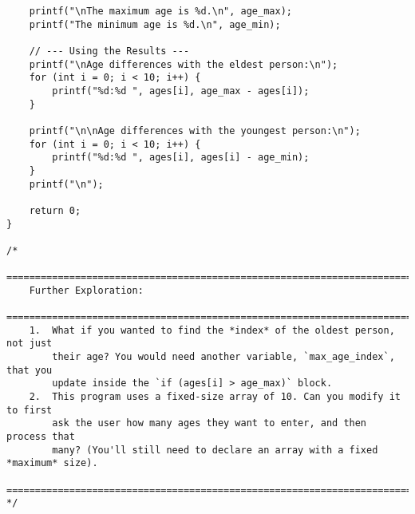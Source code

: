 \documentclass[11pt]{book}
\begin{document}
\begin{verbatim}
    printf("\nThe maximum age is %d.\n", age_max);
    printf("The minimum age is %d.\n", age_min);

    // --- Using the Results ---
    printf("\nAge differences with the eldest person:\n");
    for (int i = 0; i < 10; i++) {
        printf("%d:%d ", ages[i], age_max - ages[i]);
    }

    printf("\n\nAge differences with the youngest person:\n");
    for (int i = 0; i < 10; i++) {
        printf("%d:%d ", ages[i], ages[i] - age_min);
    }
    printf("\n");

    return 0;
}

/*
    ================================================================================
    Further Exploration:
    ================================================================================
    1.  What if you wanted to find the *index* of the oldest person, not just
        their age? You would need another variable, `max_age_index`, that you
        update inside the `if (ages[i] > age_max)` block.
    2.  This program uses a fixed-size array of 10. Can you modify it to first
        ask the user how many ages they want to enter, and then process that
        many? (You'll still need to declare an array with a fixed *maximum* size).
    ================================================================================
*/

\end{verbatim}
\clearpage
\end{document}

